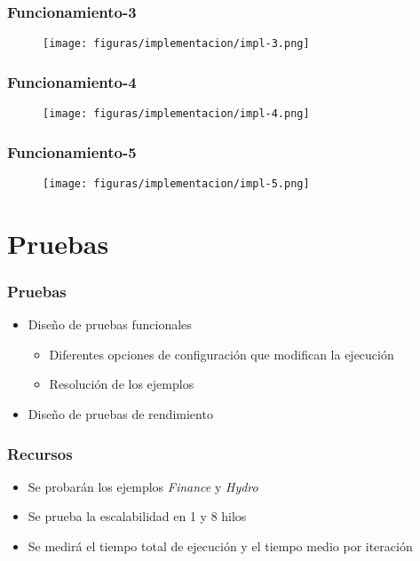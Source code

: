 \documentclass{beamer}
\begin{document}
\begin{frame}{}
    \frametitle{Funcionamiento-3}
    \begin{figure}[H]
        \centerline{\texttt{[image: figuras/implementacion/impl-3.png]}}
    \end{figure}
\end{frame}

\begin{frame}{}
    \frametitle{Funcionamiento-4}
    \begin{figure}[H]
        \centerline{\texttt{[image: figuras/implementacion/impl-4.png]}}
    \end{figure}
\end{frame}


\begin{frame}{}
    \frametitle{Funcionamiento-5}
    \begin{figure}[H]
        \centerline{\texttt{[image: figuras/implementacion/impl-5.png]}}
    \end{figure}
\end{frame}

\section{Pruebas}

\begin{frame}{}
    \frametitle{Pruebas}
    \begin{itemize}
        \item Diseño de pruebas funcionales
        \begin{itemize}
            \item Diferentes opciones de configuración que modifican la ejecución
            \item Resolución de los ejemplos
        \end{itemize}
        \item Diseño de pruebas de rendimiento
    \end{itemize}
\end{frame}

\begin{frame}{}
    \frametitle{Recursos}
    \begin{itemize}
        \item Se probarán los ejemplos \textit{Finance} y \textit{Hydro}
        \item Se prueba la escalabilidad en 1 y 8 hilos
        \item Se medirá el tiempo total de ejecución y el tiempo medio por iteración
    \end{itemize}
\end{frame}
\end{document}
